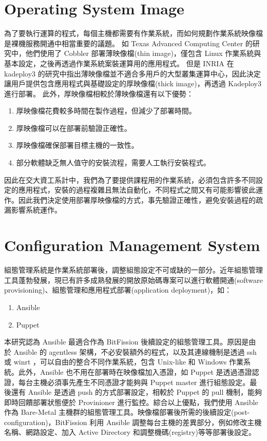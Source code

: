 \section{Operating System Image}
為了要執行運算的程式，每個主機都需要有作業系統，而如何規劃作業系統映像檔是裸機服務開通中相當重要的議題。
如 Texas Advanced Computing Center 的研究\cite{mclay2011best}中，他們使用了 Cobbler 部署薄映像檔(thin image)，僅包含 Linux 作業系統與基本設定，之後再透過作業系統案裝運算用的應用程式。
但是 INRIA 在 kadeploy3 的研究中\cite{kadeploy3}指出薄映像檔並不適合多用戶的大型叢集運算中心，因此決定讓用戶提供包含應用程式與基礎設定的厚映像檔(thick image)，再透過 Kadeploy3 進行部署。
此外，厚映像檔相較於薄映像檔還有以下優勢：
\begin{enumerate}
\item 厚映像檔花費較多時間在製作過程，但減少了部署時間。
\item 厚映像檔可以在部署前驗證正確性。
\item 厚映像檔確保部署目標主機的一致性。
\item 部分軟體缺乏無人值守的安裝流程，需要人工執行安裝程式。
\end{enumerate}
因此在交大資工系計中，我們為了要提供課程用的作業系統，必須包含許多不同設定的應用程式，安裝的過程複雜且無法自動化，不同程式之間又有可能影響彼此運作。因此我們決定使用部署厚映像檔的方式，事先驗證正確性，避免安裝過程的疏漏影響系統運作。

\section{Configuration Management System}
組態管理系統是作業系統部署後，調整組態設定不可或缺的一部分。近年組態管理工具蓬勃發展，現已有許多成熟發展的開放原始碼專案可以進行軟體開通(software provisioning)、組態管理和應用程式部署(application deployment)，如：
\begin{enumerate}
\item Ansible\cite{ansible}
\item Puppet\cite{puppet}
\end{enumerate}
本研究認為 Ansible 最適合作為 BitFission 後續設定的組態管理工具。原因是由於 Ansible 的 agentless 架構，不必安裝額外的程式，以及其連線機制是透過 ssh 或 winrt ，可以自由的整合不同作業系統，包含 Unix-like 和 Windows 作業系統。此外，Ansible 也不用在部署時在映像檔加入憑證，如 Puppet 是透過憑證認證，每台主機必須事先產生不同憑證才能夠與 Puppet master 進行組態設定。最後還有 Ansible 是透過 push 的方式部署設定，相較於 Puppet 的 pull 機制，能夠即時回饋部署狀態便於 Provinioner 進行監控。綜合以上優點，我們使用 Ansible 作為 Bare-Metal 主機群的組態管理工具。映像檔部署後所需的後續設定(post-configuration)，BitFission 利用 Ansible 調整每台主機的差異部分，例如修改主機名稱、網路設定、加入 Active Directory 和調整機碼(registry)等等部署後設定。

